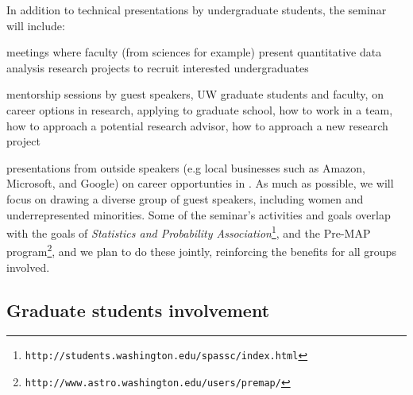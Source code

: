 In addition to technical presentations by undergraduate
students, the seminar will include:
\bits
\item meetings where faculty (from sciences for example) present quantitative data analysis research projects to recruit interested undergraduates
\item  mentorship sessions by guest speakers, UW graduate students and faculty, on career options in research, applying to graduate school, how to work in a team, how to approach a potential research advisor, how to approach a new research project
\item presentations from outside speakers (e.g local businesses such as Amazon,
  Microsoft, and Google) on career opportunties in \cdse. As much as possible, we will focus on drawing a diverse group of guest speakers, including women and underrepresented minorities.
\eits
Some of the seminar's activities and goals overlap with the goals of {\em Statistics and Probability Association}\footnote{{\tt http://students.washington.edu/spassc/index.html}}, and the Pre-MAP program\footnote{\tt http://www.astro.washington.edu/users/premap/}, 
and we plan to do these jointly, reinforcing the  benefits for all groups involved.


\subsection{Graduate students involvement}
\label{sec:activities-grad}

